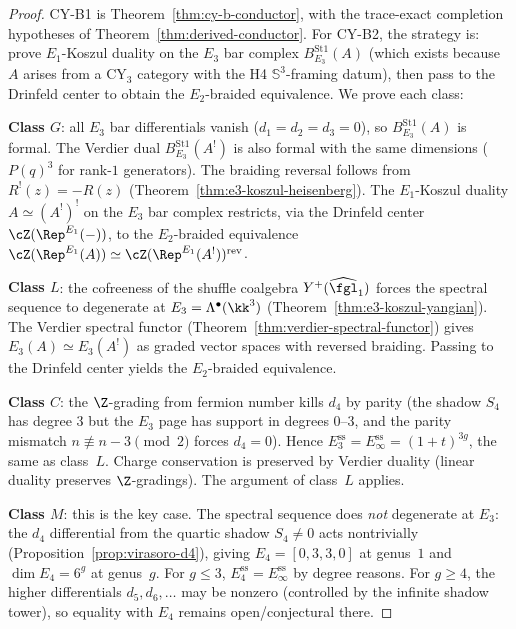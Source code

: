 \begin{proof}
CY-B1 is Theorem~\ref{thm:cy-b-conductor}, with the trace-exact
completion hypotheses of Theorem~\ref{thm:derived-conductor}.
For CY-B2, the strategy is: prove $E_1$-Koszul duality on the $E_3$ bar
complex $B_{E_3}^{\mathrm{St1}}(A)$ (which exists because $A$ arises from a CY$_3$ category
with the H4 $\mathbb{S}^3$-framing datum), then pass to the Drinfeld center to obtain
the $E_2$-braided equivalence. We prove each class:

\medskip
\noindent\textbf{Class $G$}: all $E_3$ bar differentials vanish ($d_1 = d_2 =
d_3 = 0$), so $B_{E_3}^{\mathrm{St1}}(A)$ is formal. The Verdier dual $B_{E_3}^{\mathrm{St1}}(A^!)$ is
also formal with the same dimensions ($P(q)^3$ for rank-$1$ generators).
The braiding reversal follows from $R^!(z) = -R(z)$
(Theorem~\ref{thm:e3-koszul-heisenberg}). The $E_1$-Koszul duality
$A \simeq (A^!)^!$ on the $E_3$ bar complex restricts, via the Drinfeld center
$\cZ(\Rep^{E_1}(-))$, to the $E_2$-braided equivalence
$\cZ(\Rep^{E_1}(A)) \simeq \cZ(\Rep^{E_1}(A^!))^{\mathrm{rev}}$.

\medskip
\noindent\textbf{Class $L$}: the cofreeness of the shuffle coalgebra
$Y^+(\widehat{\fgl}_1)$ forces the spectral sequence to degenerate at
$E_3 = \Lambda^\bullet(\kk^3)$ (Theorem~\ref{thm:e3-koszul-yangian}).
The Verdier spectral functor (Theorem~\ref{thm:verdier-spectral-functor})
gives $E_3(A) \simeq E_3(A^!)$ as graded vector spaces with reversed braiding.
Passing to the Drinfeld center yields the $E_2$-braided equivalence.

\medskip
\noindent\textbf{Class $C$}: the $\Z$-grading from fermion number kills
$d_4$ by parity (the shadow $S_4$ has degree $3$ but the $E_3$ page has
support in degrees $0$--$3$, and the parity mismatch
$n \not\equiv n - 3 \pmod{2}$ forces $d_4 = 0$). Hence
$E^{\mathrm{ss}}_3 = E^{\mathrm{ss}}_\infty = (1+t)^{3g}$, the same as class~$L$.
Charge conservation is preserved by Verdier duality (linear duality
preserves $\Z$-gradings). The argument of class~$L$ applies.

\medskip
\noindent\textbf{Class $M$}: this is the key case. The spectral sequence
does \emph{not} degenerate at $E_3$: the $d_4$ differential from the
quartic shadow $S_4 \neq 0$ acts nontrivially
(Proposition~\ref{prop:virasoro-d4}), giving $E_4 = [0,3,3,0]$ at genus~$1$
and $\dim E_4 = 6^g$ at genus~$g$. For $g \leq 3$, $E^{\mathrm{ss}}_4 = E^{\mathrm{ss}}_\infty$
by degree reasons. For $g \geq 4$, the higher differentials $d_5, d_6, \ldots$
may be nonzero (controlled by the infinite shadow tower), so equality
with $E_4$ remains open/conjectural there.


\end{proof}
